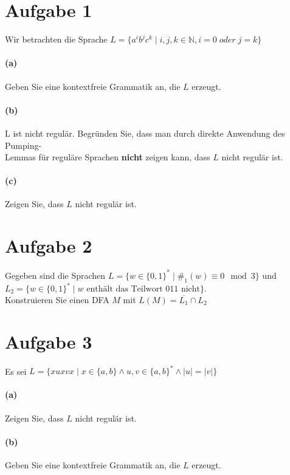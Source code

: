 \documentclass[titlepage]{article}
\renewcommand{\]}{\right]}
\renewcommand{\[}{\left[}
\renewcommand{\)}{\right)}
\renewcommand{\(}{\left(}
\renewcommand{\|}{\;|\;}
\begin{document}
\begingroup\let\clearpage\relax
	
	
	\section*{Aufgabe 1}
	Wir betrachten die Sprache $L=\{a^ib^jc^k\mid i,j,k\in\mathbb{N},i=0\;oder\;j=k\}$
		\paragraph{(a)} Geben Sie eine kontextfreie Grammatik an, die $L$ erzeugt.
		\paragraph{(b)} L ist nicht regulär. Begründen Sie, dass man durch direkte Anwendung des Pumping-\\Lemmas für reguläre Sprachen \textbf{nicht} zeigen kann, dass $L$ nicht regulär ist.
		\paragraph{(c)} Zeigen Sie, dass $L$ nicht regulär ist.
	\section*{Aufgabe 2}Gegeben sind die Sprachen $L=\{w\in\{0,1\}^*\mid\#_1(w)\equiv0\mod3\}$ und\\ $L_2=\{w\in\{0,1\}^*\mid w\text{ enthält das Teilwort 011 nicht}\}.$ \\Konstruieren Sie einen DFA $M$ mit $L(M)=\overline{L_1}\cap L_2$
	
	\section*{Aufgabe 3} Es sei $L=\{xuxvx\mid x\in\{a,b\}\land u,v\in\{a,b\}^*\land\mid u\mid=\mid v\mid\}$
		\paragraph{(a)} Zeigen Sie, dass $L$ nicht regulär ist.
		\paragraph{(b)} Geben Sie eine kontextfreie Grammatik an, die $L$ erzeugt.

\endgroup
\end{document}
